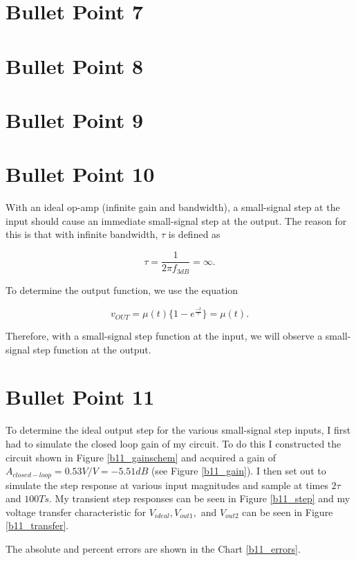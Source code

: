 \documentclass{article}
\begin{document}
\section{Bullet Point 7}
\section{Bullet Point 8}
\section{Bullet Point 9}
\section{Bullet Point 10}
With an ideal op-amp (infinite gain and bandwidth), a small-signal step at the input should cause an immediate small-signal step at the output. The reason for this is that with infinite bandwidth, $\tau$ is defined as

\begin{equation}
\tau = \frac{1}{2\pi f_{3dB}} = \infty.
\end{equation}

To determine the output function, we use the equation

\begin{equation}
v_{OUT} = \mu (t) \{1-e^{\frac{-t}{\tau}}\} = \mu (t).
\end{equation}

Therefore, with a small-signal step function at the input, we will observe a small-signal step function at the output.
\newpage

\section{Bullet Point 11}
To determine the ideal output step for the various small-signal step inputs, I first had to simulate the closed loop gain of my circuit. To do this I constructed the circuit shown in Figure \ref{b11_gainschem} and acquired a gain of $A_{closed-loop} = 0.53V/V = -5.51dB$ (see Figure \ref{b11_gain}). I then set out to simulate the step response at various input magnitudes and sample at times $2\tau$ and $100Ts$. My transient step responses can be seen in Figure \ref{b11_step} and my voltage transfer characteristic for $V_{ideal}, V_{out1},$ and $V_{out2}$ can be seen in Figure \ref{b11_transfer}.

The absolute and percent errors are shown in the Chart \ref{b11_errors}.
\end{document}
